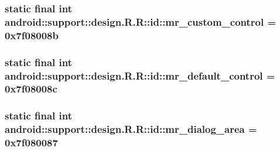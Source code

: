 \hypertarget{classandroid_1_1support_1_1design_1_1_r_1_1id_1ceb9bbac777d1ce7a9c03eab0b5b00b}{
\subsubsection[{mr\_\-custom\_\-control}]{\setlength{\rightskip}{0pt plus 5cm}static final int android::support::design.R.R::id::mr\_\-custom\_\-control = 0x7f08008b}}
\label{classandroid_1_1support_1_1design_1_1_r_1_1id_1ceb9bbac777d1ce7a9c03eab0b5b00b}


\hypertarget{classandroid_1_1support_1_1design_1_1_r_1_1id_70e84fa5b4a94b74a51fc85b71c2cdcb}{
\subsubsection[{mr\_\-default\_\-control}]{\setlength{\rightskip}{0pt plus 5cm}static final int android::support::design.R.R::id::mr\_\-default\_\-control = 0x7f08008c}}
\label{classandroid_1_1support_1_1design_1_1_r_1_1id_70e84fa5b4a94b74a51fc85b71c2cdcb}


\hypertarget{classandroid_1_1support_1_1design_1_1_r_1_1id_a6abfa22cb4b06993426a597a9c7496b}{
\subsubsection[{mr\_\-dialog\_\-area}]{\setlength{\rightskip}{0pt plus 5cm}static final int android::support::design.R.R::id::mr\_\-dialog\_\-area = 0x7f080087}}
\label{classandroid_1_1support_1_1design_1_1_r_1_1id_a6abfa22cb4b06993426a597a9c7496b}



